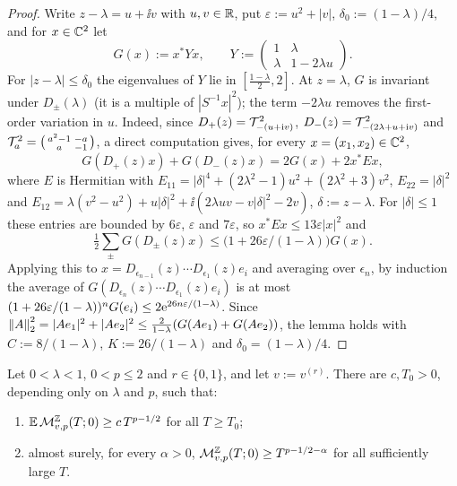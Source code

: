 \begin{proof}
Write $z-\lambda=u+\ii v$ with $u,v\in\mathbb{R}$, put $\varepsilon:=u^2+|v|$, $\delta_0:=(1-\lambda)/4$, and for $x\in\mathbb{C}^2$ let
\[
  G(x):=x^*Yx,\qquad Y:=\begin{pmatrix}1&\lambda\\\lambda&1-2\lambda u\end{pmatrix}.
\]
For $|z-\lambda|\le\delta_0$ the eigenvalues of $Y$ lie in $[\frac{1-\lambda}2,2]$.  At $z=\lambda$, $G$ is invariant under
$D_\pm(\lambda)$ (it is a multiple of $|S^{-1}x|^2$); the term $-2\lambda u$ removes the first-order variation in $u$.  Indeed,
since $D_+(z)=\mathcal{T}_{-(u+\mathrm{i} v)}^2$, $D_-(z)=\mathcal{T}_{-(2\lambda+u+\mathrm{i} v)}^2$ and
$\mathcal{T}_a^2=\bigl(\begin{smallmatrix}a^2-1&-a\\a&-1\end{smallmatrix}\bigr)$, a direct computation gives, for every
$x=(x_1,x_2)\in\mathbb{C}^2$,
\[
  G(D_+(z)x)+G(D_-(z)x)=2G(x)+2x^*Ex,
\]
where $E$ is Hermitian with $E_{11}=|\delta|^4+(2\lambda^2-1)u^2+(2\lambda^2+3)v^2$, $E_{22}=|\delta|^2$ and
$E_{12}=\lambda(v^2-u^2)+u|\delta|^2+\ii(2\lambda uv-v|\delta|^2-2v)$, $\delta:=z-\lambda$.  For $|\delta|\le1$ these entries
are bounded by $6\varepsilon$, $\varepsilon$ and $7\varepsilon$, so $x^*Ex\le13\varepsilon|x|^2$ and
\[
  \tfrac12\textstyle\sum_\pm G(D_\pm(z)x)\le\bigl(1+26\varepsilon/(1-\lambda)\bigr)G(x).
\]
Applying this to $x=D_{\epsilon_{n-1}}(z)\cdots D_{\epsilon_1}(z)e_i$ and averaging over $\epsilon_n$, by induction the average of
$G(D_{\epsilon_n}(z)\cdots D_{\epsilon_1}(z)e_i)$ is at most $(1+26\varepsilon/(1-\lambda))^nG(e_i)\le2\mathrm{e}^{26n\varepsilon/(1-\lambda)}$.  Since
$\left\|A\right\|_2^2=|Ae_1|^2+|Ae_2|^2\le\frac2{1-\lambda}(G(Ae_1)+G(Ae_2))$, the lemma holds with $C:=8/(1-\lambda)$,
$K:=26/(1-\lambda)$ and $\delta_0=(1-\lambda)/4$.
\end{proof}

\begin{proposition}[Superdiffusion]\label{prop:dimersuper}
Let $0<\lambda<1$, $0<p\le2$ and $r\in\{0,1\}$, and let $v:=v^{(r)}$.  There are $c,T_0>0$, depending only on $\lambda$
and $p$, such that:
\begin{enumerate}[label=(\alph*)]
\item $\mathbb{E}\,\mathcal{M}^{\mathbb{Z}}_{v,p}(T;0)\ge c\,T^{p-1/2}$ for all $T\ge T_0$;
\item almost surely, for every $\alpha>0$, $\mathcal{M}^{\mathbb{Z}}_{v,p}(T;0)\ge T^{p-1/2-\alpha}$ for all sufficiently large $T$.
\end{enumerate}
\end{proposition}


